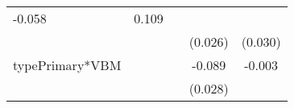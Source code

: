 \documentclass[12pt,twoside]{reedthesis}
\begin{document}
\begin{longtable}[]{@{}lcccc@{}}
\begin{minipage}[t]{0.14\columnwidth}
  -0.058\strut
  \end{minipage} & \begin{minipage}[t]{0.11\columnwidth}\centering\strut
  0.109\strut
  \end{minipage}\tabularnewline
  \begin{minipage}[t]{0.26\columnwidth}\raggedright\strut
  \strut
  \end{minipage} & \begin{minipage}[t]{0.12\columnwidth}\centering\strut
  \strut
  \end{minipage} & \begin{minipage}[t]{0.14\columnwidth}\centering\strut
  \strut
  \end{minipage} & \begin{minipage}[t]{0.14\columnwidth}\centering\strut
  (0.026)\strut
  \end{minipage} & \begin{minipage}[t]{0.11\columnwidth}\centering\strut
  (0.030)\strut
  \end{minipage}\tabularnewline
  \begin{minipage}[t]{0.26\columnwidth}\raggedright\strut
  typePrimary*VBM\strut
  \end{minipage} & \begin{minipage}[t]{0.12\columnwidth}\centering\strut
  \strut
  \end{minipage} & \begin{minipage}[t]{0.14\columnwidth}\centering\strut
  \strut
  \end{minipage} & \begin{minipage}[t]{0.14\columnwidth}\centering\strut
  -0.089\strut
  \end{minipage} & \begin{minipage}[t]{0.11\columnwidth}\centering\strut
  -0.003\strut
  \end{minipage}\tabularnewline
  \begin{minipage}[t]{0.26\columnwidth}\raggedright\strut
  \strut
  \end{minipage} & \begin{minipage}[t]{0.12\columnwidth}\centering\strut
  \strut
  \end{minipage} & \begin{minipage}[t]{0.14\columnwidth}\centering\strut
  \strut
  \end{minipage} & \begin{minipage}[t]{0.14\columnwidth}\centering\strut
  (0.028)\strut
  \end{minipage} & \begin{minipage}[t]{0.11\columnwidth}\centering\strut

\end{minipage}
\end{longtable}
\end{document}
